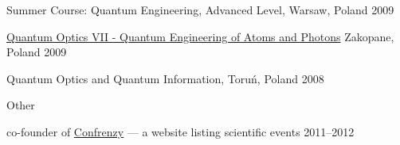 \documentclass[margin,line]{resume}
\begin{document}
\begin{resume}
\begin{list2}
        \item {Summer Course: Quantum Engineering, Advanced Level}, Warsaw, Poland \hfill 2009
        \item \href{http://www.cft.edu.pl/QuantumOpticsVII/}{Quantum Optics VII - Quantum Engineering of Atoms and Photons} Zakopane, Poland \hfill 2009
        \item {Quantum Optics and Quantum Information}, Toruń, Poland \hfill 2008 
                \end{list2} 
       
     Other
	        \begin{list2}
	    \item co-founder of \href{http://confrenzy.com}{Confrenzy} --- a website listing scientific events \hfill 2011--2012
                \end{list2} 



\vspace{3mm}


\end{resume}
\end{document}

